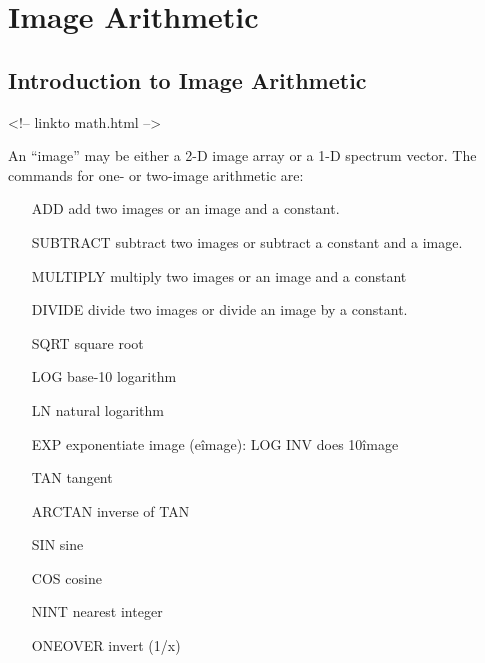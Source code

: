 \chapter{Image Arithmetic}

\section{Introduction to Image Arithmetic}
\begin{rawhtml}
<!-- linkto math.html -->
\end{rawhtml}

%
% 
%

An ``image'' may be either a 2-D image array or a 1-D spectrum vector.  The
commands for one- or two-image arithmetic are:

\begin{itemize}
  \item[ADD\hfill]{add two images or an image and a constant.}
  \item[SUBTRACT\hfill]{subtract two images or subtract a constant and a 
       image.}
  \item[MULTIPLY\hfill]{multiply two images or an image and a constant}
  \item[DIVIDE\hfill]{divide two images or divide an image by a constant.}
  \item[SQRT\hfill]{square root}
  \item[LOG\hfill]{base-10 logarithm}
  \item[LN\hfill]{natural logarithm}
  \item[EXP\hfill]{exponentiate image (e\^image):  LOG INV does 10\^image}
  \item[TAN\hfill]{tangent}
  \item[ARCTAN\hfill]{inverse of TAN}
  \item[SIN\hfill]{sine}
  \item[COS\hfill]{cosine}
  \item[NINT\hfill]{nearest integer}
  \item[ONEOVER\hfill]{invert (1/x)}
\end{itemize}

